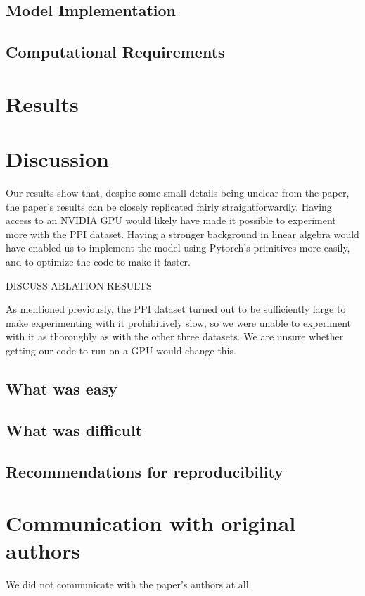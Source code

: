 \documentclass{article}
\begin{document}
    \subsection{Model Implementation}\label{subsec:model-implementation}
    

    \subsection{Computational Requirements}\label{subsec:computational-requirements}
    

    \section{Results}\label{sec:results}
    

    \section{Discussion}\label{sec:discussion}
    Our results show that, despite some small details being unclear from the
    paper, the paper's results can be closely replicated fairly
    straightforwardly. Having access to an NVIDIA GPU would likely have made
    it possible to experiment more with the PPI dataset. Having a stronger
    background in linear algebra would have enabled us to implement the model
    using Pytorch's primitives more easily, and to optimize the code to make it
    faster.

    DISCUSS ABLATION RESULTS

    As mentioned previously, the PPI dataset turned out to be sufficiently
    large to make experimenting with it prohibitively slow, so we were unable
    to experiment with it as thoroughly as with the other three datasets. We
    are unsure whether getting our code to run on a GPU would change this.

    \subsection{What was easy}\label{subsec:what-was-easy}
    \subsection{What was difficult}\label{subsec:what-was-difficult}
    \subsection{Recommendations for reproducibility}\label{subsec:recommendations}

    \section{Communication with original authors}
    We did not communicate with the paper's authors at all.

    
\end{document}
